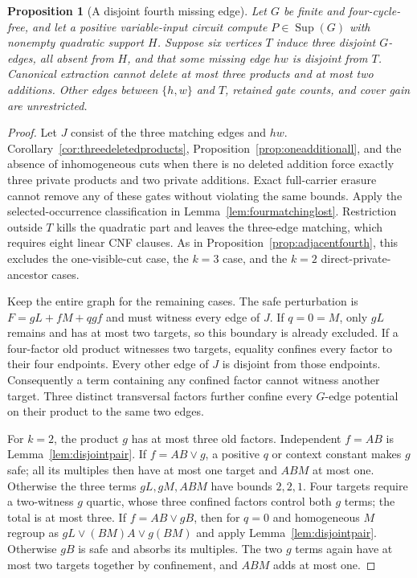\documentclass[11pt]{article}
\newcommand{\Sup}{\operatorname{Sup}}
\newtheorem{proposition}[theorem]{Proposition}
\theoremstyle{definition}
\theoremstyle{remark}
\begin{document}
\begin{proposition}[A disjoint fourth missing edge]\label{prop:disjointfourth}
Let $G$ be finite and four-cycle-free, and let a positive variable-input circuit compute $P\in\Sup(G)$ with nonempty quadratic support $H$. Suppose six vertices $T$ induce three disjoint $G$-edges, all absent from $H$, and that some missing edge $hw$ is disjoint from $T$. Canonical extraction cannot delete at most three products and at most two additions. Other edges between $\{h,w\}$ and $T$, retained gate counts, and cover gain are unrestricted.
\end{proposition}
\begin{proof}
Let $J$ consist of the three matching edges and $hw$. Corollary~\ref{cor:threedeletedproducts}, Proposition~\ref{prop:oneadditionall}, and the absence of inhomogeneous cuts when there is no deleted addition force exactly three private products and two private additions. Exact full-carrier erasure cannot remove any of these gates without violating the same bounds. Apply the selected-occurrence classification in Lemma~\ref{lem:fourmatchinglost}. Restriction outside $T$ kills the quadratic part and leaves the three-edge matching, which requires eight linear CNF clauses. As in Proposition~\ref{prop:adjacentfourth}, this excludes the one-visible-cut case, the $k=3$ case, and the $k=2$ direct-private-ancestor cases.

Keep the entire graph for the remaining cases. The safe perturbation is $F=gL+fM+qgf$ and must witness every edge of $J$. If $q=0=M$, only $gL$ remains and has at most two targets, so this boundary is already excluded. If a four-factor old product witnesses two targets, equality confines every factor to their four endpoints. Every other edge of $J$ is disjoint from those endpoints. Consequently a term containing any confined factor cannot witness another target. Three distinct transversal factors further confine every $G$-edge potential on their product to the same two edges.

For $k=2$, the product $g$ has at most three old factors. Independent $f=AB$ is Lemma~\ref{lem:disjointpair}. If $f=AB\vee g$, a positive $q$ or context constant makes $g$ safe; all its multiples then have at most one target and $ABM$ at most one. Otherwise the three terms $gL,gM,ABM$ have bounds $2,2,1$. Four targets require a two-witness $g$ quartic, whose three confined factors control both $g$ terms; the total is at most three. If $f=AB\vee gB$, then for $q=0$ and homogeneous $M$ regroup as $gL\vee(BM)A\vee g(BM)$ and apply Lemma~\ref{lem:disjointpair}. Otherwise $gB$ is safe and absorbs its multiples. The two $g$ terms again have at most two targets together by confinement, and $ABM$ adds at most one.


\end{proof}
\end{document}
